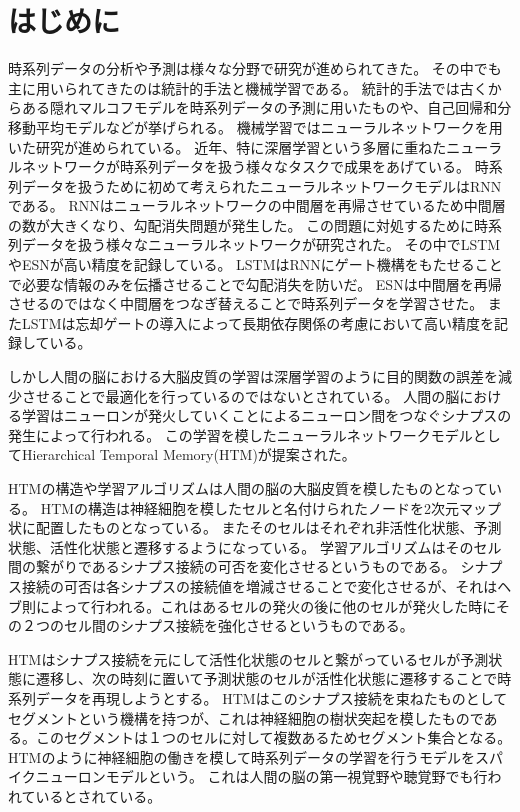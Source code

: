 \chapter{はじめに}
時系列データの分析や予測は様々な分野で研究が進められてきた。
その中でも主に用いられてきたのは統計的手法と機械学習である。
統計的手法では古くからある隠れマルコフモデル\cite{hmm_original}を時系列データの予測に用いたもの\cite{hmm}や、自己回帰和分移動平均モデル\cite{arima}などが挙げられる。
機械学習ではニューラルネットワークを用いた研究が進められている。
近年、特に深層学習という多層に重ねたニューラルネットワークが時系列データを扱う様々なタスクで成果をあげている。
時系列データを扱うために初めて考えられたニューラルネットワークモデルはRNN\cite{rnn}である。
RNNはニューラルネットワークの中間層を再帰させているため中間層の数が大きくなり、勾配消失問題が発生した。
この問題に対処するために時系列データを扱う様々なニューラルネットワークが研究された。
その中でLSTM\cite{lstm_original}やESN\cite{esn}が高い精度を記録している。
LSTMはRNNにゲート機構をもたせることで必要な情報のみを伝播させることで勾配消失を防いだ。
ESNは中間層を再帰させるのではなく中間層をつなぎ替えることで時系列データを学習させた。
またLSTMは忘却ゲートの導入\cite{lstm_forget_gate}によって長期依存関係の考慮において高い精度を記録している。

しかし人間の脳における大脳皮質の学習は深層学習のように目的関数の誤差を減少させることで最適化を行っているのではないとされている\cite{neurons}。
人間の脳における学習はニューロンが発火していくことによるニューロン間をつなぐシナプスの発生によって行われる。
この学習を模したニューラルネットワークモデルとしてHierarchical Temporal Memory(HTM)が提案された。\cite{htm}

HTMの構造や学習アルゴリズムは人間の脳の大脳皮質を模したものとなっている。
HTMの構造は神経細胞を模したセルと名付けられたノードを2次元マップ状に配置したものとなっている。
またそのセルはそれぞれ非活性化状態、予測状態、活性化状態と遷移するようになっている。
学習アルゴリズムはそのセル間の繋がりであるシナプス接続の可否を変化させるというものである。
シナプス接続の可否は各シナプスの接続値を増減させることで変化させるが、それはヘブ則によって行われる。これはあるセルの発火の後に他のセルが発火した時にその２つのセル間のシナプス接続を強化させるというものである。

HTMはシナプス接続を元にして活性化状態のセルと繋がっているセルが予測状態に遷移し、次の時刻に置いて予測状態のセルが活性化状態に遷移することで時系列データを再現しようとする。
HTMはこのシナプス接続を束ねたものとしてセグメントという機構を持つが、これは神経細胞の樹状突起を模したものである。このセグメントは１つのセルに対して複数あるためセグメント集合となる。
HTMのように神経細胞の働きを模して時系列データの学習を行うモデルをスパイクニューロンモデル\cite{spike_neuron}という。
これは人間の脳の第一視覚野や聴覚野でも行われているとされている。\cite{brain_seq}

